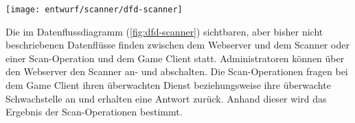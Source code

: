 \begin{center}
	\texttt{[image: entwurf/scanner/dfd-scanner]}
	\label{fig:dfd-scanner}
\end{center}

Die im Datenflussdiagramm (\autoref{fig:dfd-scanner}) sichtbaren, aber bisher nicht beschriebenen Datenflüsse finden zwischen dem Webserver und dem Scanner oder einer Scan-Operation und dem Game Client statt. Administratoren können über den Webserver den Scanner an- und abschalten. Die Scan-Operationen fragen bei dem Game Client ihren überwachten Dienst beziehungsweise ihre überwachte Schwachstelle an und erhalten eine Antwort zurück. Anhand dieser wird das Ergebnis der Scan-Operationen bestimmt.